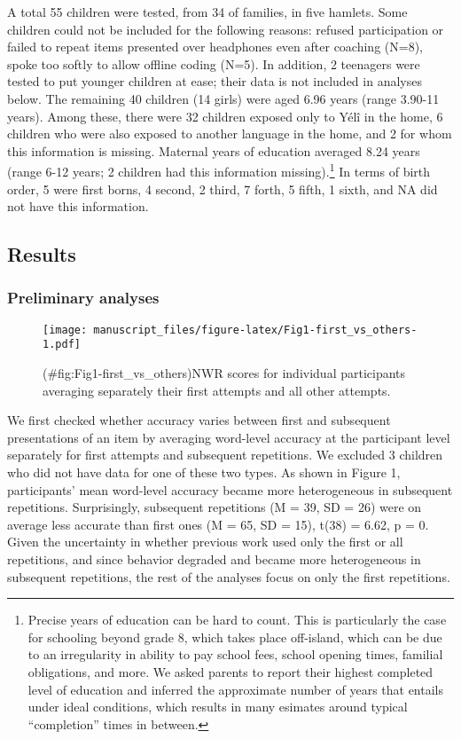 \documentclass[english,,man,floatsintext]{apa6}
\begin{document}
A total 55 children were tested, from 34 of families, in five hamlets. Some children could not be included for the following reasons: refused participation or failed to repeat items presented over headphones even after coaching (N=8), spoke too softly to allow offline coding (N=5). In addition, 2 teenagers were tested to put younger children at ease; their data is not included in analyses below. The remaining 40 children (14 girls) were aged 6.96 years (range 3.90-11 years). Among these, there were 32 children exposed only to Yélî in the home, 6 children who were also exposed to another language in the home, and 2 for whom this information is missing. Maternal years of education averaged 8.24 years (range 6-12 years; 2 children had this information missing).\footnote{Precise years of education can be hard to count. This is particularly the case for schooling beyond grade 8, which takes place off-island, which can be due to an irregularity in ability to pay school fees, school opening times, familial obligations, and more. We asked parents to report their highest completed level of education and inferred the approximate number of years that entails under ideal conditions, which results in many esimates around typical ``completion'' times in between.} In terms of birth order, 5 were first borns, 4 second, 2 third, 7 forth, 5 fifth, 1 sixth, and NA did not have this information.

\hypertarget{results}{%
\subsection{Results}\label{results}}

\hypertarget{preliminary-analyses}{%
\subsubsection{Preliminary analyses}\label{preliminary-analyses}}

\begin{figure}
\centering
\texttt{[image: manuscript\_files/figure-latex/Fig1-first\_vs\_others-1.pdf]}
\caption{(\#fig:Fig1-first\_vs\_others)NWR scores for individual participants averaging separately their first attempts and all other attempts.}
\end{figure}

We first checked whether accuracy varies between first and subsequent presentations of an item by averaging word-level accuracy at the participant level separately for first attempts and subsequent repetitions. We excluded 3 children who did not have data for one of these two types. As shown in Figure 1, participants' mean word-level accuracy became more heterogeneous in subsequent repetitions. Surprisingly, subsequent repetitions (M = 39, SD = 26)
were on average less accurate than first ones (M = 65, SD = 15), t(38) = 6.62, p = 0. Given the uncertainty in whether previous work used only the first or all repetitions, and since behavior degraded and became more heterogeneous in subsequent repetitions, the rest of the analyses focus on only the first repetitions.
\end{document}
